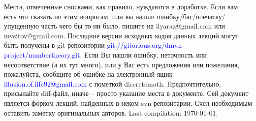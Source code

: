 \documentclass[unicode, 10pt, a4paper, oneside, fleqn]{article}
\begin{document}
\setmainfont{URW Chancery L}
Места, отмеченные сносками, как правило, нуждаются в доработке. Если
вам есть что сказать по этим вопросам, или вы нашли
ошибку/баг/опечатку/упущенную часть чего бы то ни было, пишите на
ilyaraz@gmail.com или mvsitov@gmail.com. 
Последние версии исходных кодов данных
лекций могут быть получены в git-репозитории  \textcolor{blue}{
  git://gitorious.org/dmvn-project/numbertheory.git}.  Если Вы нашли
ошибку, неточность или несоответствие (а их тут много), или у Вас
есть предложения или пожелания, пожалуйста, сообщите об ошибке на
электронный ящик \textcolor{blue}{illusion.of.life92@gmail.com} с
пометкой discretemath.  Предпочтительно, присылайте diff-файл, иначе
-- просто указание места в документе.  Сей документ является форком
лекций, найденных в неком svn репозитарии. Счел необходимым оставить
заметку оригинальных авторов. Last compilation: \today.
\setmonofont{DejaVu Sans Mono}
\setsansfont{DejaVu Sans}
\setmainfont{DejaVu Sans}
\tableofcontents

















\end{document}
